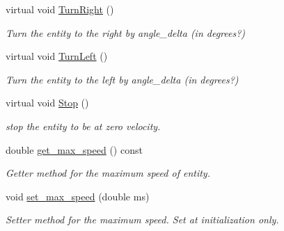 \begin{DoxyCompactItemize}
virtual void \mbox{\hyperlink{class_motion_handler_a22b99a21307a534165d811740d8aeac1}{Turn\+Right}} ()
\begin{DoxyCompactList}\small\item\em Turn the entity to the right by angle\+\_\+delta (in degrees?) \end{DoxyCompactList}\item 
\mbox{\label{class_motion_handler_a922e3dd8c6a98b54607837c5e669c557}} 
virtual void \mbox{\hyperlink{class_motion_handler_a922e3dd8c6a98b54607837c5e669c557}{Turn\+Left}} ()
\begin{DoxyCompactList}\small\item\em Turn the entity to the left by angle\+\_\+delta (in degrees?) \end{DoxyCompactList}\item 
\mbox{\label{class_motion_handler_aa04a0d87165965ea7ba8be6b21cfa0cf}} 
virtual void \mbox{\hyperlink{class_motion_handler_aa04a0d87165965ea7ba8be6b21cfa0cf}{Stop}} ()
\begin{DoxyCompactList}\small\item\em stop the entity to be at zero velocity. \end{DoxyCompactList}\item 
\mbox{\label{class_motion_handler_a71e2e4cdddfb8c49eb18cf41878a08c0}} 
double \mbox{\hyperlink{class_motion_handler_a71e2e4cdddfb8c49eb18cf41878a08c0}{get\+\_\+max\+\_\+speed}} () const
\begin{DoxyCompactList}\small\item\em Getter method for the maximum speed of entity. \end{DoxyCompactList}\item 
\mbox{\label{class_motion_handler_a32e832d35e73e9db85c16b3ff569196e}} 
void \mbox{\hyperlink{class_motion_handler_a32e832d35e73e9db85c16b3ff569196e}{set\+\_\+max\+\_\+speed}} (double ms)
\begin{DoxyCompactList}\small\item\em Setter method for the maximum speed. Set at initialization only. \end{DoxyCompactList}\item 
\mbox{\label{class_motion_handler_af6ef42cdbf31ec1589e14d5dfd639d79}} 

\end{DoxyCompactItemize}
